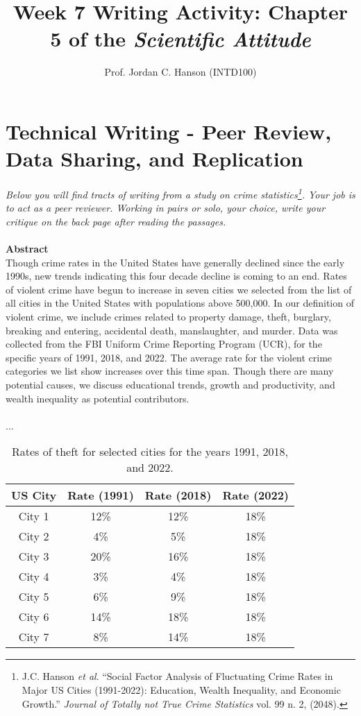 \documentclass{article}
\begin{document}
\title{Week 7 Writing Activity: Chapter 5 of the \textit{Scientific Attitude}}
\author{Prof. Jordan C. Hanson (INTD100)}

\maketitle

\section{Technical Writing - Peer Review, Data Sharing, and Replication}

\textit{Below you will find tracts of writing from a study on crime statistics\footnote{J.C. Hanson \textit{et al}.  ``Social Factor Analysis of Fluctuating Crime Rates in Major US Cities (1991-2022): Education, Wealth Inequality, and Economic Growth.'' \textit{Journal of Totally not True Crime Statistics} vol. 99 n. 2, (2048).}.  Your job is to act as a peer reviewer.  Working in pairs or solo, your choice, write your critique on the back page after reading the passages.} \\ \\
\small
\textbf{Abstract}\\
Though crime rates in the United States have generally declined since the early 1990s, new trends indicating this four decade decline is coming to an end.  Rates of violent crime have begun to increase in seven cities we selected from the list of all cities in the United States with populations above 500,000.  In our definition of violent crime, we include crimes related to property damage, theft, burglary, breaking and entering, accidental death, manslaughter, and murder.  Data was collected from the FBI Uniform Crime Reporting Program (UCR), for the specific years of 1991, 2018, and 2022.  The average rate for the violent crime categories we list show increases over this time span.  Though there are many potential causes, we discuss educational trends, growth and productivity, and wealth inequality as potential contributors. \\ \\
... \\
\begin{table}[ht]
\centering
\begin{tabular}{| c | c | c | c |} \hline
US City & Rate (1991) & Rate (2018) & Rate (2022) \\ \hline
City 1 & 12\% & 12\% & 18\% \\ \hline
City 2 & 4\% & 5\% & 18\% \\ \hline
City 3 & 20\% & 16\% & 18\% \\ \hline
City 4 & 3\% & 4\% & 18\% \\ \hline
City 5 & 6\% & 9\% & 18\% \\ \hline
City 6 & 14\% & 18\% & 18\% \\ \hline
City 7 & 8\% & 14\% & 18\% \\ \hline
\end{tabular}
\caption{\label{tab:1} Rates of theft for selected cities for the years 1991, 2018, and 2022.}
\end{table}
\end{document}
